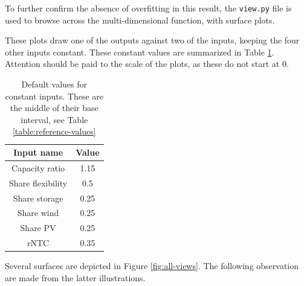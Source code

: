 To further confirm the absence of overfitting in this result, the \texttt{view.py} file is used to browse across the multi-dimensional function, with surface plots.

These plots draw one of the outputs against two of the inputs, keeping the four other inputs constant. These constant values are summarized in Table \ref{tab:default-view-values}. Attention should be paid to the scale of the plots, as these do not start at 0.

\begin{table}[h!]
    \centering
    \begin{tabular}{|c|c|}
        \hline
        Input name & Value \\ \hline
        Capacity ratio & 1.15 \\
        Share flexibility & 0.5 \\
        Share storage & 0.25 \\
        Share wind & 0.25 \\
        Share PV & 0.25 \\
        rNTC & 0.35 \\ \hline
    \end{tabular}
    \caption{Default values for constant inputs. These are the middle of their base interval, see Table \ref{table:reference-values}}
    \label{tab:default-view-values}
\end{table}

Several surfaces are depicted in Figure \ref{fig:all-views}. The following observation are made from the latter illustrations.


